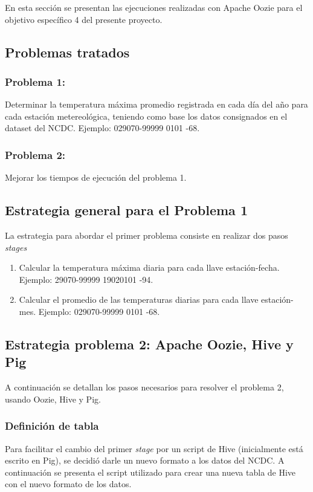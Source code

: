 En esta sección se presentan las ejecuciones realizadas con Apache Oozie para el objetivo específico 4 del presente proyecto.

\subsection{Problemas tratados}

\subsubsection{Problema 1:} Determinar la temperatura máxima promedio registrada en cada día del año para cada estación metereológica, teniendo como base los datos consignados en el dataset del NCDC. Ejemplo: 029070-99999 0101 -68.

\subsubsection{Problema 2:} Mejorar los tiempos de ejecución del problema 1.

\subsection{Estrategia general para el Problema 1}

La estrategia para abordar el primer problema consiste en realizar dos pasos \textit{stages} 

\begin{enumerate}

\item Calcular la temperatura máxima diaria para cada llave estación-fecha. Ejemplo: 29070-99999 19020101 -94.

\item Calcular el promedio de las temperaturas diarias para cada llave estación-mes. Ejemplo: 029070-99999 0101 -68.

\end{enumerate}

\subsection{Estrategia problema 2: Apache Oozie, Hive y Pig}

A continuación se detallan los pasos necesarios para resolver el problema 2, usando Oozie, Hive y Pig. \\

\subsubsection{Definición de tabla} Para facilitar el cambio del primer \textit{stage} por un script de Hive (inicialmente está escrito en Pig), se decidió darle un nuevo formato a los datos del NCDC. A continuación se presenta el script utilizado para crear una nueva tabla de Hive con el nuevo formato de los datos.

